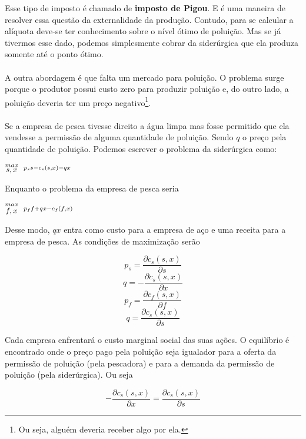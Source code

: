 \documentclass[a4paper,11pt,oneside]{book}
\theoremstyle{definition}
\theoremstyle{break}
\begin{document}
Esse tipo de imposto é chamado de \textbf{imposto de Pigou}. E é uma maneira de resolver essa questão da externalidade da produção. Contudo, para se calcular a alíquota deve-se ter conhecimento sobre o nível ótimo de poluição. Mas se já tivermos esse dado, podemos simplesmente cobrar da siderúrgica que ela produza somente até o ponto ótimo.
\\
\\
A outra abordagem é que falta um mercado para poluição. O problema surge porque o produtor possui custo zero para produzir poluição e, do outro lado, a poluição deveria ter um preço negativo\footnote{Ou seja, alguém deveria receber algo por ela.}.
\\
\\
Se a empresa de pesca tivesse direito a água limpa mas fosse permitido que ela vendesse a permissão de alguma quantidade de poluição. Sendo $q$ o preço pela quantidade de poluição. Podemos escrever o problema da siderúrgica como:

\begin{center}
	\LARGE $ \stackrel{max}{\text{\small $s,x$}} \ \ \stackrel{p_ss - c_s(s,x) - qx}{\ } $ %
\end{center}

Enquanto o problema da empresa de pesca seria

\begin{center}
	\LARGE $ \stackrel{max}{\text{\small $f,x$}} \ \ %
	\stackrel{p_ff + qx - c_f(f,x)}{\ } $ %
\end{center}

Desse modo, $qx$ entra como custo para a empresa de aço e uma receita para a empresa de pesca. As condições de maximização serão 

$$ p_s = \frac{\partial c_s(s,x)}{\partial s} $$
$$ q = - \frac{\partial c_s(s,x)}{\partial x} $$
$$ p_f = \frac{\partial c_f(s,x)}{\partial f} $$
$$ q = \frac{\partial c_s(s,x)}{\partial s} $$

Cada empresa enfrentará o custo marginal social das suas ações. O equilíbrio é encontrado onde o preço pago pela poluição seja igualador para a oferta da permissão de poluição (pela pescadora) e para a demanda da permissão de poluição (pela siderúrgica). Ou seja

$$-\frac{\partial c_s(s,x)}{\partial x} = \frac{\partial c_s(s,x)}{\partial s}$$
\end{document}
